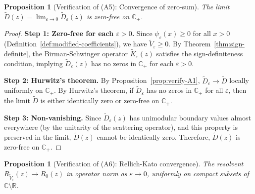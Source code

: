 ﻿\documentclass[12pt,a4paper]{article}
\newtheorem{proposition}[theorem]{Proposition}
\theoremstyle{definition}
\theoremstyle{remark}
\newcommand{\CC}{\mathbb{C}}
\newcommand{\RR}{\mathbb{R}}
\begin{document}
\begin{proposition}[Verification of (A5): Convergence of zero-sum]\label{prop:verify-A5}
The limit $\widetilde{D}(z) = \lim_{\varepsilon \to 0} \widetilde{D}_\varepsilon(z)$ is zero-free on $\CC_+$.
\end{proposition}

\begin{proof}
\textbf{Step 1: Zero-free for each $\varepsilon > 0$.}
Since $\psi_\varepsilon(x) \geq 0$ for all $x > 0$ (Definition~\ref{def:modified-coefficients}), we have $\widetilde{V}_\varepsilon \geq 0$. By Theorem~\ref{thm:sign-definite}, the Birman-Schwinger operator $\widetilde{K}_\varepsilon(z)$ satisfies the sign-definiteness condition, implying $\widetilde{D}_\varepsilon(z)$ has no zeros in $\CC_+$ for each $\varepsilon > 0$.

\textbf{Step 2: Hurwitz's theorem.}
By Proposition~\ref{prop:verify-A1}, $\widetilde{D}_\varepsilon \to \widetilde{D}$ locally uniformly on $\CC_+$. By Hurwitz's theorem, if $\widetilde{D}_\varepsilon$ has no zeros in $\CC_+$ for all $\varepsilon$, then the limit $\widetilde{D}$ is either identically zero or zero-free on $\CC_+$.

\textbf{Step 3: Non-vanishing.}
Since $\widetilde{D}_\varepsilon(z)$ has unimodular boundary values almost everywhere (by the unitarity of the scattering operator), and this property is preserved in the limit, $\widetilde{D}(z)$ cannot be identically zero. Therefore, $\widetilde{D}(z)$ is zero-free on $\CC_+$.
\end{proof}

\begin{proposition}[Verification of (A6): Rellich-Kato convergence]\label{prop:verify-A6}
The resolvent $R_{\widetilde{V}_\varepsilon}(z) \to R_0(z)$ in operator norm as $\varepsilon \to 0$, uniformly on compact subsets of $\CC \setminus \RR$.
\end{proposition}
\end{document}
